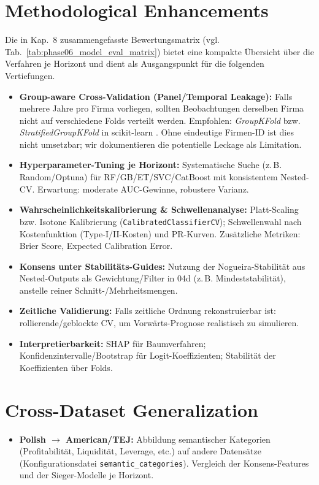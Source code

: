 \section{Methodological Enhancements}
Die in Kap.~8 zusammengefasste Bewertungsmatrix (vgl. Tab.~\ref{tab:phase06_model_eval_matrix}) bietet eine kompakte Übersicht über die Verfahren je Horizont und dient als Ausgangspunkt für die folgenden Vertiefungen.
\begin{itemize}
  \item \textbf{Group-aware Cross-Validation (Panel/Temporal Leakage):} Falls mehrere Jahre pro Firma vorliegen, sollten Beobachtungen derselben Firma nicht auf verschiedene Folds verteilt werden. Empfohlen: \emph{GroupKFold} bzw. \emph{StratifiedGroupKFold} in scikit-learn \parencite{sklearnGroupKFold,sklearnCVGuide}. Ohne eindeutige Firmen-ID ist dies nicht umsetzbar; wir dokumentieren die potentielle Leckage als Limitation.
  \item \textbf{Hyperparameter-Tuning je Horizont:} Systematische Suche (z.\,B. Random/Optuna) für RF/GB/ET/SVC/CatBoost mit konsistentem Nested-CV. Erwartung: moderate AUC-Gewinne, robustere Varianz.
  \item \textbf{Wahrscheinlichkeitskalibrierung \& Schwellenanalyse:} Platt-Scaling bzw. Isotone Kalibrierung (\texttt{CalibratedClassifierCV}); Schwellenwahl nach Kostenfunktion (Type-I/II-Kosten) und PR-Kurven. Zusätzliche Metriken: Brier Score, Expected Calibration Error.
  \item \textbf{Konsens unter Stabilitäts-Guides:} Nutzung der Nogueira-Stabilität aus Nested-Outputs als Gewichtung/Filter in 04d (z.\,B. Mindeststabilität), anstelle reiner Schnitt-/Mehrheitsmengen.
  \item \textbf{Zeitliche Validierung:} Falls zeitliche Ordnung rekonstruierbar ist: rollierende/geblockte CV, um Vorwärts-Prognose realistisch zu simulieren.
  \item \textbf{Interpretierbarkeit:} SHAP für Baumverfahren; Konfidenzintervalle/Bootstrap für Logit-Koeffizienten; Stabilität der Koeffizienten über Folds.
\end{itemize}

\section{Cross-Dataset Generalization}
\begin{itemize}
  \item \textbf{Polish $\rightarrow$ American/TEJ:} Abbildung semantischer Kategorien (Profitabilität, Liquidität, Leverage, etc.) auf andere Datensätze (Konfigurationsdatei \texttt{semantic\_categories}). Vergleich der Konsens-Features und der Sieger-Modelle je Horizont.
\end{itemize}


